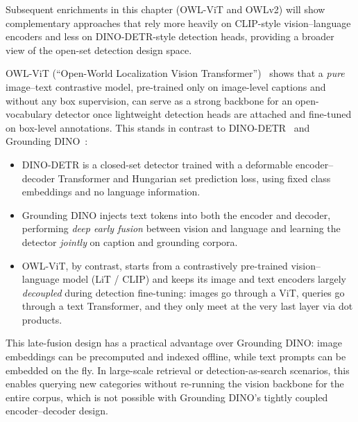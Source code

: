 \begin{enrichment}
\begin{enrichment}
	\noindent
	Subsequent enrichments in this chapter (OWL-ViT and OWLv2) will show complementary approaches that rely more heavily on CLIP-style vision–language encoders and less on DINO-DETR-style detection heads, providing a broader view of the open-set detection design space.

\end{enrichment}	
\end{enrichment}

\newpage

\begin{enrichment}
	\label{enr:chapter14_owlvit}
	
	\begin{enrichment}
		
		OWL-ViT (``Open-World Localization Vision Transformer'')~\cite{minderer2022_owlvit} shows that a \emph{pure} image--text contrastive model, pre-trained only on image-level captions and without any box supervision, can serve as a strong backbone for an open-vocabulary detector once lightweight detection heads are attached and fine-tuned on box-level annotations.
		This stands in contrast to DINO-DETR~\cite{zhang2022_dino} and Grounding DINO~\cite{liu2023_groundingdino}:
		\begin{itemize}
			\item DINO-DETR is a closed-set detector trained with a deformable encoder--decoder Transformer and Hungarian set prediction loss, using fixed class embeddings and no language information.
			\item Grounding DINO injects text tokens into both the encoder and decoder, performing \emph{deep early fusion} between vision and language and learning the detector \emph{jointly} on caption and grounding corpora.
			\item OWL-ViT, by contrast, starts from a contrastively pre-trained vision--language model (LiT / CLIP) and keeps its image and text encoders largely \emph{decoupled} during detection fine-tuning: images go through a ViT, queries go through a text Transformer, and they only meet at the very last layer via dot products.
		\end{itemize}
		This late-fusion design has a practical advantage over Grounding DINO: image embeddings can be precomputed and indexed offline, while text prompts can be embedded on the fly.
		In large-scale retrieval or detection-as-search scenarios, this enables querying new categories without re-running the vision backbone for the entire corpus, which is not possible with Grounding DINO’s tightly coupled encoder--decoder design.
		

\end{enrichment}
\end{enrichment}

